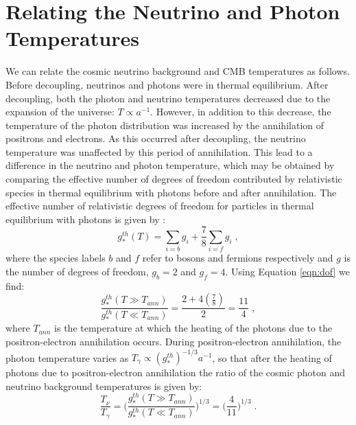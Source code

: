 \documentclass{aastex}
\begin{document}
\medskip
%
{}
%


\appendix

\section{Relating the Neutrino and Photon
  Temperatures}\label{app:AppA}
We can relate the cosmic neutrino background and CMB
temperatures as follows.
Before decoupling, neutrinos and photons were in
thermal equilibrium.  After decoupling, both the photon and neutrino
temperatures decreased due to the expansion of the universe: $T
\propto a^{-1}$. However, in addition to this decrease, the temperature of the
photon distribution was increased by the annihilation of positrons
and electrons. As this occurred after decoupling, the neutrino
temperature was unaffected by this period of annihilation.  
This lead to a difference in the neutrino and
photon temperature, which may be obtained 
 by comparing the effective number of degrees of
freedom contributed by relativistic species in thermal equilibrium
with photons before and after annihilation.  The
effective number of relativistic degrees of freedom for particles in
thermal equilibrium with photons is given by \citep{baumann3}: 
\begin{equation}\label{eqn:dof}
  g_*^{th}(T) = \sum_{i=b} g_i + \frac{7}{8} \sum_{i=f} g_i \;,
\end{equation}
where the species labels $b$ and $f$ refer to bosons and fermions
respectively and $g$ is the number of degrees of freedom, $g_b=2$ and
$g_f=4$.
 Using Equation \eqref{eqn:dof} we find:
\begin{equation}
  \frac{ g_*^{th}(T\gg T_{ann})}{g_*^{th}(T\ll T_{ann})} = \frac{ 2 + 4
    (\frac{7}{8})}{ 2 } = \frac{11}{4} \;,
\end{equation}
where $T_{ann}$ is the temperature at which the heating of the photons
due to the positron-electron annihilation occurs.  
During positron-electron annihilation, the photon
temperature varies as $ T_\gamma \propto (g_*^{th})^{-1/3} a^{-1} $, so that after
the heating of photons due to positron-electron annihilation the ratio
of the cosmic photon and neutrino background temperatures is given by:
\begin{equation}
  \frac{T_\nu}{T_\gamma} = \bigg( \frac{g_*^{th}(  T \gg T_{ann} )}{ g_*^{th}(T
    \ll T_{ann})}   \bigg)^{1/3} =\bigg(\frac{4}{11}\bigg)^{1/3} \;.
\end{equation}
\end{document}
